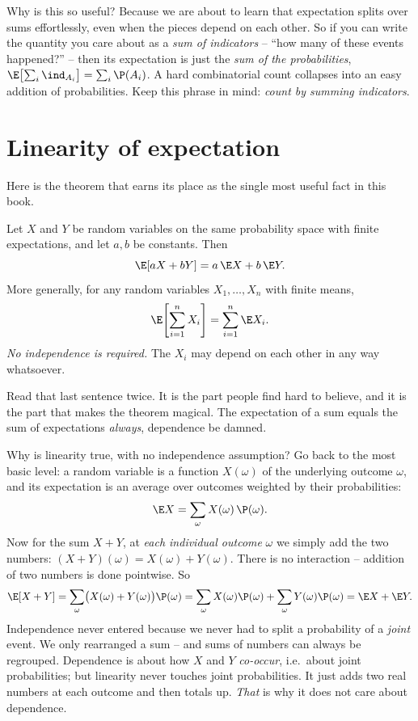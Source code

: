 \begin{happeningbox}
Why is this so useful? Because we are about to learn that expectation splits over
sums effortlessly, even when the pieces depend on each other. So if you can write
the quantity you care about as a \emph{sum of indicators} -- ``how many of these
events happened?'' -- then its expectation is just the \emph{sum of the
probabilities}, $\E\bigl[\sum_i \ind_{A_i}\bigr] = \sum_i \P(A_i)$. A hard
combinatorial count collapses into an easy addition of probabilities. Keep this
phrase in mind: \emph{count by summing indicators}.
\end{happeningbox}

\section{Linearity of expectation}
\label{ch08:linearity}

Here is the theorem that earns its place as the single most useful fact in this
book.

\begin{theorem}
\label{ch08:thm-linearity}
Let $X$ and $Y$ be random variables on the same probability space with finite
expectations, and let $a, b$ be constants. Then
\[
  \E[aX + bY] = a\,\E X + b\,\E Y.
\]
More generally, for any random variables $X_1,\dots,X_n$ with finite means,
\[
  \E\!\left[\sum_{i=1}^n X_i\right] = \sum_{i=1}^n \E X_i.
\]
\emph{No independence is required.} The $X_i$ may depend on each other in any way
whatsoever.
\end{theorem}

Read that last sentence twice. It is the part people find hard to believe, and it
is the part that makes the theorem magical. The expectation of a sum equals the
sum of expectations \emph{always}, dependence be damned.

\begin{whybox}
Why is linearity true, with no independence assumption? Go back to the most
basic level: a random variable is a function $X(\omega)$ of the underlying
outcome $\omega$, and its expectation is an average over outcomes weighted by
their probabilities:
\[
  \E X = \sum_{\omega} X(\omega)\,\P(\omega).
\]
Now for the sum $X + Y$, at \emph{each individual outcome} $\omega$ we simply add
the two numbers: $(X+Y)(\omega) = X(\omega) + Y(\omega)$. There is no interaction
-- addition of two numbers is done pointwise. So
\[
  \E[X+Y] = \sum_\omega \bigl(X(\omega) + Y(\omega)\bigr)\P(\omega)
          = \sum_\omega X(\omega)\P(\omega) + \sum_\omega Y(\omega)\P(\omega)
          = \E X + \E Y.
\]
Independence never entered because we never had to split a probability of a
\emph{joint} event. We only rearranged a sum -- and sums of numbers can always be
regrouped. Dependence is about how $X$ and $Y$ \emph{co-occur}, i.e.\ about joint
probabilities; but linearity never touches joint probabilities. It just adds two
real numbers at each outcome and then totals up. \emph{That} is why it does not
care about dependence.
\end{whybox}

